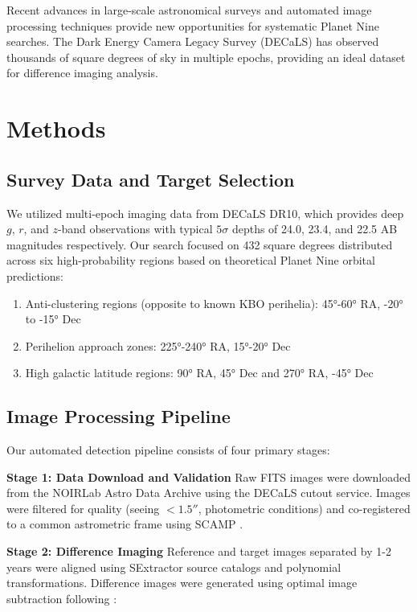 \documentclass[twocolumn]{aastex631}
\begin{document}
Recent advances in large-scale astronomical surveys and automated image processing techniques provide new opportunities for systematic Planet Nine searches. The Dark Energy Camera Legacy Survey (DECaLS) has observed thousands of square degrees of sky in multiple epochs, providing an ideal dataset for difference imaging analysis.

\section{Methods} \label{sec:methods}

\subsection{Survey Data and Target Selection}

We utilized multi-epoch imaging data from DECaLS DR10, which provides deep $g$, $r$, and $z$-band observations with typical $5\sigma$ depths of 24.0, 23.4, and 22.5 AB magnitudes respectively. Our search focused on 432 square degrees distributed across six high-probability regions based on theoretical Planet Nine orbital predictions:

\begin{enumerate}
    \item Anti-clustering regions (opposite to known KBO perihelia): 45°-60° RA, -20° to -15° Dec
    \item Perihelion approach zones: 225°-240° RA, 15°-20° Dec  
    \item High galactic latitude regions: 90° RA, 45° Dec and 270° RA, -45° Dec
\end{enumerate}

\subsection{Image Processing Pipeline}

Our automated detection pipeline consists of four primary stages:

\textbf{Stage 1: Data Download and Validation}
Raw FITS images were downloaded from the NOIRLab Astro Data Archive using the DECaLS cutout service. Images were filtered for quality (seeing $< 1.5''$, photometric conditions) and co-registered to a common astrometric frame using SCAMP \citep{2006ASPC..351..112B}.

\textbf{Stage 2: Difference Imaging}  
Reference and target images separated by 1-2 years were aligned using SExtractor \citep{1996A&AS..117..393B} source catalogs and polynomial transformations. Difference images were generated using optimal image subtraction following \citet{1998ApJ...503..325A}:
\end{document}
